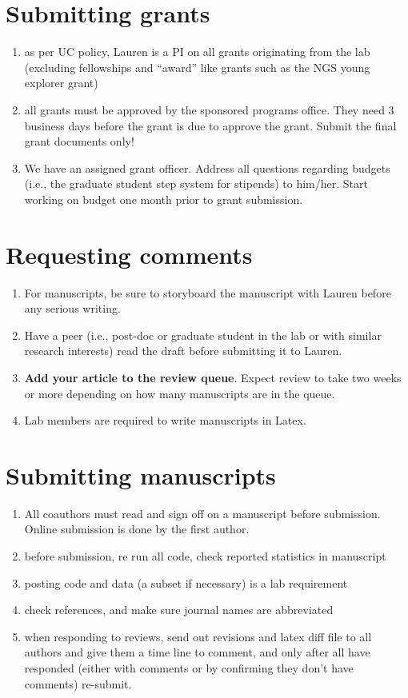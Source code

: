\documentclass[12pt]{article}
\begin{document}
\section{Submitting grants}
\begin{enumerate}
\item as per UC policy, Lauren is a PI on all grants originating from
  the lab (excluding fellowships and ``award'' like grants such as the
  NGS young explorer grant)
\item all grants must be approved by the sponsored programs
  office. They need 3 business days before the grant is due to
  approve the grant. Submit the final grant documents only!
\item We have an assigned grant officer.  Address all questions
  regarding budgets (i.e., the graduate student step system for
  stipends) to him/her. Start working on budget one month prior to
  grant submission.
\end{enumerate}

\section{Requesting comments}
\begin{enumerate}
\item For manuscripts, be sure to storyboard the manuscript with
  Lauren before any serious writing.
\item Have a peer (i.e., post-doc or graduate student in the lab or
  with similar research interests) read the draft before submitting it
  to Lauren.
\item \textbf{Add your article to the review queue}. Expect review to take two weeks or more depending on how
  many manuscripts are in the queue.
\item Lab members are required to write manuscripts in Latex.
\end{enumerate}

\section{Submitting manuscripts}
\begin{enumerate}
\item All coauthors must read and sign off on a manuscript before
  submission. Online submission is done by the first author.
\item before submission, re run all code, check reported statistics in
  manuscript
\item posting code and data (a subset if necessary) is a lab
  requirement
\item check references, and make sure journal names are abbreviated
\item when responding to reviews, send out revisions and latex diff
  file to all authors and give them a time line to comment, and only
  after all have responded (either with comments or by confirming they
  don't have comments) re-submit.
\end{enumerate}
\end{document}
